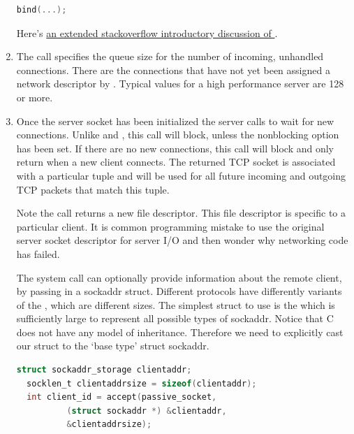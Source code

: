 \begin{enumerate}
\begin{lstlisting}[language=C]
  bind(...);
  \end{lstlisting}

  Here's \href{http://stackoverflow.com/questions/14388706/socket-options-so-reuseaddr-and-so-reuseport-how-do-they-differ-do-they-mean-t}{an extended stackoverflow introductory discussion of }.

  \item {}

    The  call specifies the queue size for the number of incoming, unhandled connections.
    There are the connections that have not yet been assigned a network descriptor by .
    Typical values for a high performance server are 128 or more.

  \item {}

  Once the server socket has been initialized the server calls  to wait for new connections.
  Unlike   and , this call will block, unless the nonblocking option has been set.
  If there are no new connections, this call will block and only return when a new client connects.
  The returned TCP socket is associated with a particular tuple  and will be used for all future incoming and outgoing TCP packets that match this tuple.

  Note the  call returns a new file descriptor.
  This file descriptor is specific to a particular client.
  It is common programming mistake to use the original server socket descriptor for server I/O and then wonder why networking code has failed.

  The  system call can optionally provide information about the remote client, by passing in a sockaddr struct.
  Different protocols have differently variants of the , which are different sizes.
  The simplest struct to use is the  which is sufficiently large to represent all possible types of sockaddr.
  Notice that C does not have any model of inheritance.
  Therefore we need to explicitly cast our struct to the `base type' struct sockaddr.

  \begin{lstlisting}[language=C]
  struct sockaddr_storage clientaddr;
  socklen_t clientaddrsize = sizeof(clientaddr);
  int client_id = accept(passive_socket,
          (struct sockaddr *) &clientaddr,
          &clientaddrsize);
  \end{lstlisting}


\end{enumerate}
